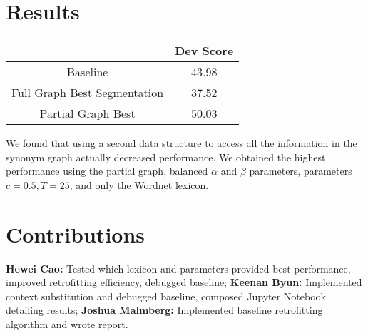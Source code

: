 \documentclass[letter]{article}
\numberwithin{equation}{section}
\newcommand{\0}{\mathbf{0}}
\begin{document}
\section{Results}

\begin{center}
\begin{tabular}{ |c|c| } 
 \hline
   & Dev Score  \\ 
\hline
Baseline & 43.98  \\  
Full Graph Best Segmentation & 37.52 \\
Partial Graph Best & 50.03 \\
 \hline
\end{tabular}
\end{center}

We found that using a second data structure to access all the information in the synonym graph actually decreased performance. We obtained the highest performance using the partial graph, balanced $\alpha$ and $\beta$ parameters, parameters $c=0.5,T=25$, and only the Wordnet lexicon.

\section{Contributions}

\textbf{Hewei Cao:} Tested which lexicon and parameters provided best performance, improved retrofitting efficiency, debugged baseline; \textbf{Keenan Byun:} Implemented context substitution and debugged baseline, composed Jupyter Notebook detailing results; \textbf{Joshua Malmberg:} Implemented baseline retrofitting algorithm and wrote report.
\end{document}
